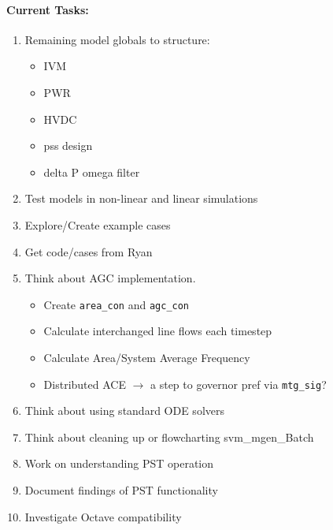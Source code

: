 \documentclass[12pt]{article}
\begin{document}
\begin{multicols}{2}
\paragraph{Current Tasks:}
	\begin{enumerate}
		\itemsep 0em 
		\item Remaining model globals to structure:
		\begin{minipage}{\linewidth}
				\begin{multicols}{2}
						\begin{itemize}
				\itemsep0em 
						\footnotesize
							\item IVM
							\item PWR
							\item HVDC
							\item pss design
							\item delta P omega filter
						\end{itemize}
				\end{multicols}
				\end{minipage}
		\item Test models in non-linear and linear simulations
		\item Explore/Create example cases
		\item Get code/cases from Ryan
		\item Think about AGC implementation.
		\begin{minipage}{\linewidth}
						\begin{itemize}
				\itemsep0em 
						\footnotesize
				\item Create \verb|area_con| and \verb|agc_con|
				\item Calculate interchanged line flows each timestep
				\item Calculate Area/System Average Frequency
				\item Distributed ACE $\longrightarrow$ a step to governor pref via \verb|mtg_sig|?
							
						\end{itemize}
				\end{minipage}
		\item Think about using standard ODE solvers
		\item Think about cleaning up or flowcharting svm\_mgen\_Batch
		\item Work on understanding PST operation
		\item Document findings of PST functionality
		\item Investigate Octave compatibility
\end{enumerate}




\end{multicols}
\end{document}
